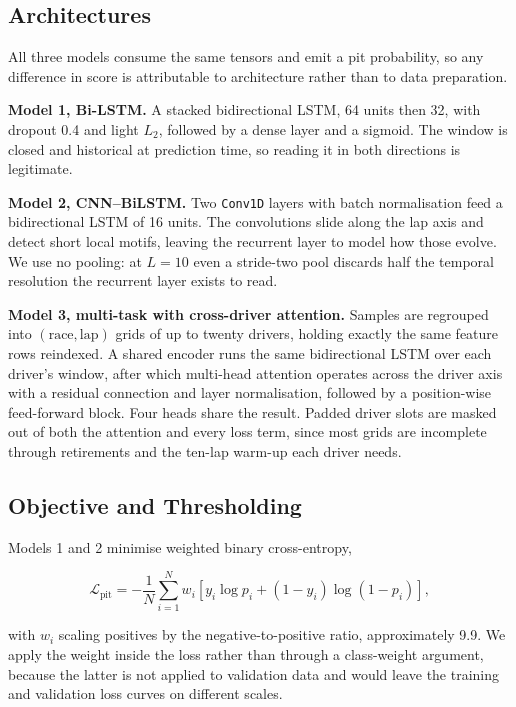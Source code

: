 \documentclass[conference]{IEEEtran}
\begin{document}
\subsection{Architectures}

All three models consume the same tensors and emit a pit probability, so any difference in score is attributable to architecture rather than to data preparation.

\textbf{Model 1, Bi-LSTM.} A stacked bidirectional LSTM, 64 units then 32, with dropout 0.4 and light $L_2$, followed by a dense layer and a sigmoid. The window is closed and historical at prediction time, so reading it in both directions is legitimate.

\textbf{Model 2, CNN--BiLSTM.} Two \texttt{Conv1D} layers with batch normalisation feed a bidirectional LSTM of 16 units. The convolutions slide along the lap axis and detect short local motifs, leaving the recurrent layer to model how those evolve. We use no pooling: at $L=10$ even a stride-two pool discards half the temporal resolution the recurrent layer exists to read.

\textbf{Model 3, multi-task with cross-driver attention.} Samples are regrouped into $(\text{race},\text{lap})$ grids of up to twenty drivers, holding exactly the same feature rows reindexed. A shared encoder runs the same bidirectional LSTM over each driver's window, after which multi-head attention operates across the driver axis with a residual connection and layer normalisation, followed by a position-wise feed-forward block. Four heads share the result. Padded driver slots are masked out of both the attention and every loss term, since most grids are incomplete through retirements and the ten-lap warm-up each driver needs.

\subsection{Objective and Thresholding}

Models 1 and 2 minimise weighted binary cross-entropy,

\begin{equation}
\mathcal{L}_{\mathrm{pit}}=-\frac{1}{N}\sum_{i=1}^{N}w_i
\left[y_i\log p_i+(1-y_i)\log(1-p_i)\right],
\end{equation}

with $w_i$ scaling positives by the negative-to-positive ratio, approximately 9.9. We apply the weight inside the loss rather than through a class-weight argument, because the latter is not applied to validation data and would leave the training and validation loss curves on different scales.
\end{document}
